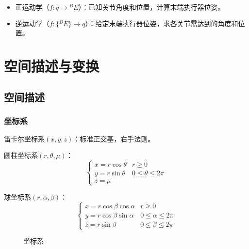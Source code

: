 \documentclass[
12pt, %
a4paper, 
oneside, %
headinclude,footinclude, %
]{scrartcl}
\begin{document}
\begin{itemize}
\item 正运动学（$ f:q \rightarrow {}^B E $）：已知关节角度和位置，计算末端执行器位姿。
\item 逆运动学（$ f:\{{}^B E\} \rightarrow q $）：给定末端执行器位姿，求各关节需达到的角度和位置。
\end{itemize}
\section{空间描述与变换}
\subsection[空间描述]{空间描述}
\subsubsection[坐标系]{坐标系}
\begin{itemize}
\item 笛卡尔坐标系$ (x, y, z) $：标准正交基，右手法则。 \\
\begin{minipage}{0.5\textwidth}
\item 圆柱坐标系$ (r, \theta, \mu) $：
$$ 
\begin{cases}
x = r \cos\theta &r \geq 0 \\
y = r \sin\theta &0 \leq \theta \leq 2 \pi \\
z = \mu
\end{cases} 
$$
\end{minipage}
\begin{minipage}{0.5\textwidth}
\item 球坐标系$ (r, \alpha, \beta) $：
$$
\begin{cases}
x = r \cos\beta \cos\alpha &r \geq 0 \\
y = r \cos\beta \sin\alpha &0 \leq \alpha \leq 2\pi \\
z = r \sin\beta &0 \leq \beta \leq 2\pi
\end{cases} 
$$
\end{minipage}
\end{itemize}

\begin{figure}[H]
\centering
{} \quad
{} \quad
{}
\caption{坐标系}
\end{figure}
\end{document}
